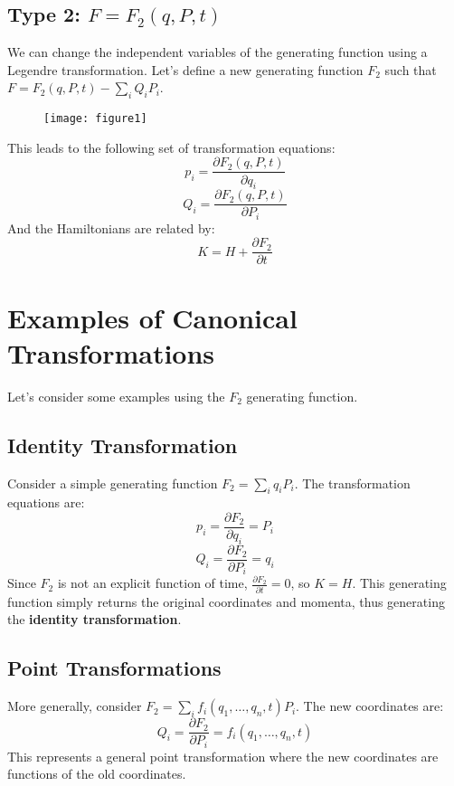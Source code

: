 \documentclass[12pt]{article}
\begin{document}
	\subsection{Type 2: $F = F_2(q, P, t)$}
	We can change the independent variables of the generating function using a Legendre transformation. Let's define a new generating function $F_2$ such that $F = F_2(q, P, t) - \sum_i Q_i P_i$.
	
	\begin{figure}[h]
		\centering
		\texttt{[image: figure1]}
		\caption{}
		\label{fig:figure1}
	\end{figure}
	
	This leads to the following set of transformation equations:
	$$
	p_i = \frac{\partial F_2(q, P, t)}{\partial q_i}
	$$
	$$
	Q_i = \frac{\partial F_2(q, P, t)}{\partial P_i}
	$$
	And the Hamiltonians are related by:
	$$
	K = H + \frac{\partial F_2}{\partial t}
	$$
	
	\section{Examples of Canonical Transformations}
	Let's consider some examples using the $F_2$ generating function.
	
	\subsection{Identity Transformation}
	Consider a simple generating function $F_2 = \sum_i q_i P_i$. The transformation equations are:
	$$
	p_i = \frac{\partial F_2}{\partial q_i} = P_i
	$$
	$$
	Q_i = \frac{\partial F_2}{\partial P_i} = q_i
	$$
	Since $F_2$ is not an explicit function of time, $\frac{\partial F_2}{\partial t} = 0$, so $K=H$.
	This generating function simply returns the original coordinates and momenta, thus generating the \textbf{identity transformation}.
	
	\subsection{Point Transformations}
	More generally, consider $F_2 = \sum_i f_i(q_1, \dots, q_n, t) P_i$. The new coordinates are:
	$$
	Q_i = \frac{\partial F_2}{\partial P_i} = f_i(q_1, \dots, q_n, t)
	$$
	This represents a general point transformation where the new coordinates are functions of the old coordinates.
	
\end{document}
